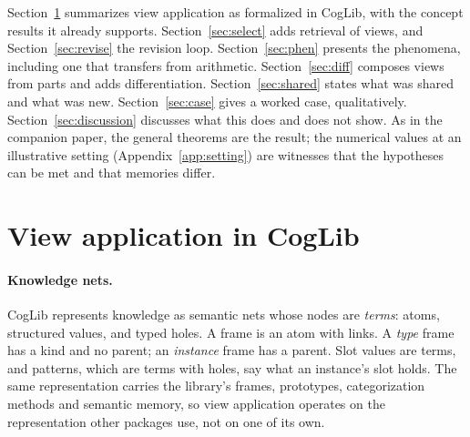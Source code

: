 \documentclass[11pt]{article}
\begin{document}
Section~\ref{sec:va} summarizes view application as formalized in CogLib, with the concept results it already supports. Section~\ref{sec:select} adds retrieval of views, and Section~\ref{sec:revise} the revision loop. Section~\ref{sec:phen} presents the phenomena, including one that transfers from arithmetic. Section~\ref{sec:diff} composes views from parts and adds differentiation. Section~\ref{sec:shared} states what was shared and what was new. Section~\ref{sec:case} gives a worked case, qualitatively. Section~\ref{sec:discussion} discusses what this does and does not show. As in the companion paper, the general theorems are the result; the numerical values at an illustrative setting (Appendix~\ref{app:setting}) are witnesses that the hypotheses can be met and that memories differ.

\section{View application in CogLib}
\label{sec:va}

\paragraph{Knowledge nets.} CogLib represents knowledge as semantic nets whose nodes are \emph{terms}: atoms, structured values, and typed holes. A frame is an atom with links. A \emph{type} frame has a kind and no parent; an \emph{instance} frame has a parent. Slot values are terms, and patterns, which are terms with holes, say what an instance's slot holds. The same representation carries the library's frames, prototypes, categorization methods and semantic memory, so view application operates on the representation other packages use, not on one of its own.
\end{document}
